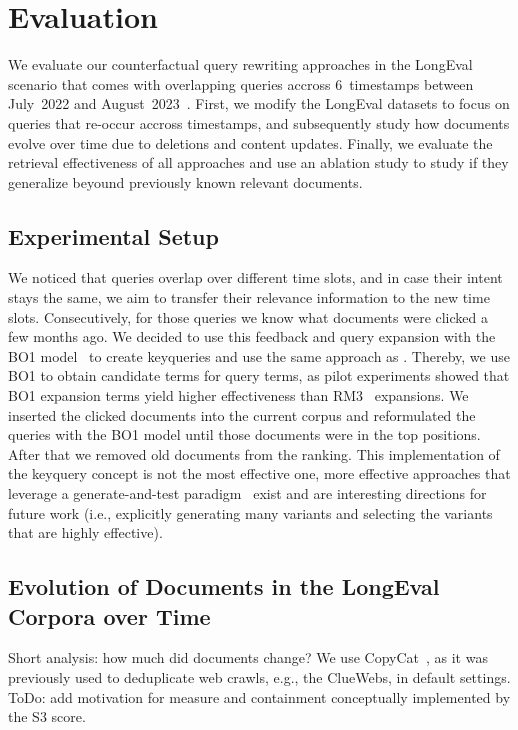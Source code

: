 \section{Evaluation}

We evaluate our counterfactual query rewriting approaches in the LongEval scenario that comes with overlapping queries accross 6~timestamps between July~2022 and August~2023~\cite{alkhalifa:2023,alkhalifa:2024,galuscakova:2023}. First, we modify the LongEval datasets to focus on queries that re-occur accross timestamps, and subsequently study how documents evolve over time due to deletions and content updates. Finally, we evaluate the retrieval effectiveness of all approaches and use an ablation study to study if they generalize beyound previously known relevant documents.

\subsection{Experimental Setup}


We noticed that queries overlap over different time slots, and in case their intent stays the same, we aim to transfer their relevance information to the new time slots. Consecutively, for those queries we know what documents were clicked a few months ago. We decided to use this feedback and query expansion with the BO1 model~\cite{amati:2003} to create keyqueries and use the same approach as \cite{froebe-mis:2022}. Thereby, we use BO1 to obtain candidate terms for query terms, as pilot experiments showed that BO1 expansion terms yield higher effectiveness than RM3~\cite{jaleel:2004} expansions. We inserted the clicked documents into the current corpus and reformulated the queries with the BO1 model until those documents were in the top positions. After that we removed old documents from the ranking. This implementation of the keyquery concept is not the most effective one, more effective approaches that leverage a generate-and-test paradigm~\cite{froebe:2021c} exist and are interesting directions for future work (i.e., explicitly generating many variants and selecting the variants that are highly effective).


\subsection{Evolution of Documents in the LongEval Corpora over Time}

Short analysis: how much did documents change? We use CopyCat~\cite{froebe:2021a}, as it was previously used to deduplicate web crawls, e.g., the ClueWebs, in default settings. ToDo: add motivation for measure and containment conceptually implemented by the S3 score.

